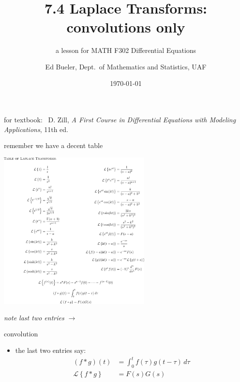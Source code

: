 \documentclass[urlcolor=blue,dvipsnames]{beamer}
\title{7.4 Laplace Transforms: \\ convolutions only}
\subtitle{a lesson for MATH F302 Differential Equations}
\author{Ed Bueler, Dept.~of Mathematics and Statistics, UAF}
\date{\tiny \today}
\begin{document}
\renewcommand{\thefootnote}{{\color{green} \arabic{footnote}}}

\begin{frame}
\titlepage

\centerline{\tiny for textbook: \, D. Zill, \emph{A First Course in Differential Equations with Modeling Applications}, 11th ed.}
\end{frame}

\newcommand{\LL}[1]{\mathcal{L}\left\{#1\right\}}
\newcommand{\LLi}[1]{\mathcal{L}^{-1}\left\{#1\right\}}



\begin{frame}{remember we have a decent table}

\vspace{-5mm}
\begin{center}
\includegraphics[height=80mm]{figs/fulllaplacetable}
\end{center}

\vspace{-13mm}
\alert{\emph{note last two entries $\to$}}
\end{frame}


\begin{frame}{convolution}

\begin{itemize}
\item the last two entries say:
\begin{align*}
(f \ast g)(t) &= \int_0^t f(\tau) g(t-\tau)\,d\tau \\
\LL{f \ast g} &= F(s) G(s)
\end{align*}
\end{itemize}
\end{frame}
\end{document}
